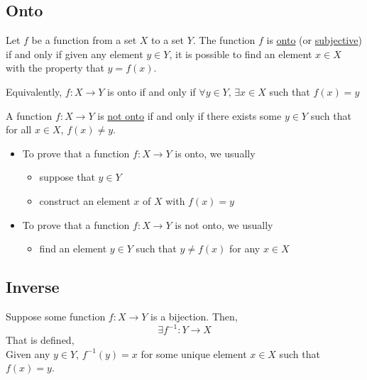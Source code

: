 \subsection{Onto}
\begin{definition}
    Let $f$ be a function from a set $X$ to a set $Y$. The function $f$ is \underline{onto} (or \underline{subjective}) if and only if given any element $y\in Y$, it is possible to find an element $x\in X$ with the property that $y = f(x)$.

    Equivalently, $f:X\rightarrow Y$ is onto if and only if $\forall y\in Y,\,\exists x\in X$ such that $f(x) = y$

    A function $f:X\rightarrow Y$ is \underline{not onto} if and only if there exists some $y\in Y$ such that for all $x\in X$, $f(x)\neq y$.
\end{definition}

\begin{itemize}
    \item To prove that a function $f: X\rightarrow Y$ is onto, we usually \begin{itemize}
        \item suppose that $y\in Y$
        \item construct an element $x$ of $X$ with $f(x) = y$
    \end{itemize}
    \item To prove that a function $f: X\rightarrow Y$ is not onto, we usually \begin{itemize}
        \item find an element $y\in Y$ such that $y \neq f(x)$ for any $x\in X$
    \end{itemize}
\end{itemize}

\subsection{Inverse}
\begin{theorm}
    Suppose some function \(f: X\to Y\) is a bijection. Then, \[\exists f^{-1}: Y\to X\]
    That is defined,\\
    Given any \(y\in Y\), \(f^{-1}(y) = x\) for some unique element \(x\in X\) such that \(f(x) = y\). 
\end{theorm}
